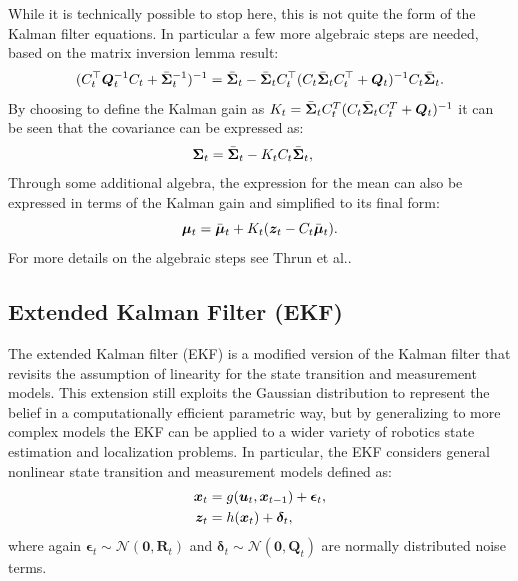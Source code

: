 While it is technically possible to stop here, this is not quite the form of the Kalman filter equations. In particular a few more algebraic steps are needed, based on the matrix inversion lemma result:
\begin{equation*}
(C_t^\top  \bm{Q}_t^{-1} C_t + \bar{\bm{\Sigma}}_t^{-1})^{-1} = \bar{\bm{\Sigma}}_t - \bar{\bm{\Sigma}}_tC_t^\top (C_t\bar{\bm{\Sigma}}_tC_t^\top  + \bm{Q}_t)^{-1}C_t\bar{\bm{\Sigma}}_t.
\end{equation*}
By choosing to define the Kalman gain as $K_t = \bar{\bm{\Sigma}}_{t}C_t^{T}(C_t\bar{\bm{\Sigma}}_{t}C_t^{T}+\bm{Q}_t)^{-1}$ it can be seen that the covariance can be expressed as:
\begin{equation*}
\begin{split}
\bm{\Sigma}_t &= \bar{\bm{\Sigma}}_t - K_tC_t\bar{\bm{\Sigma}}_t,
\end{split}
\end{equation*}
Through some additional algebra, the expression for the mean can also be expressed in terms of the Kalman gain and simplified to its final form:
\begin{equation*}
\bm{\mu}_t = \bar{\bm{\mu}}_t + K_t(\bm{z}_t-C_t\bar{\bm{\mu}}_{t}).
\end{equation*}
For more details on the algebraic steps see Thrun et al.\cite{ThrunBurgardEtAl2005}.


\subsection{Extended Kalman Filter (EKF)}
The extended Kalman filter (EKF) is a modified version of the Kalman filter that revisits the assumption of linearity for the state transition and measurement models. This extension still exploits the Gaussian distribution to represent the belief in a computationally efficient parametric way, but by generalizing to more complex models the EKF can be applied to a wider variety of robotics state estimation and localization problems. In particular, the EKF considers general nonlinear state transition and measurement models defined as:
\begin{equation}
\begin{split}
\bm{x}_t &= g(\bm{u}_t, \bm{x}_{t-1}) + \bm{\epsilon}_{t}, \\
\bm{z}_t &= h(\bm{x}_t) + \bm{\delta}_{t},
\end{split}
\end{equation}
where again $\bm{\epsilon}_{t}\sim \mathcal{N}(\bm{0},\bm{R}_t)$ and $\bm{\delta}_{t}\sim \mathcal{N}(\bm{0},\bm{Q}_t)$ are normally distributed noise terms.

